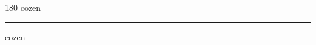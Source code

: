 
\begin{frame}
\begin{center}
\begin{turn}{180}
{\fontsize{2.5cm}{1em}\selectfont cozen}
\end{turn}
\vspace{1em}\par  
\hrule
\vspace{1em}\par  
{\fontsize{2.5cm}{1em}\selectfont cozen}
\end{center}
\end{frame}
